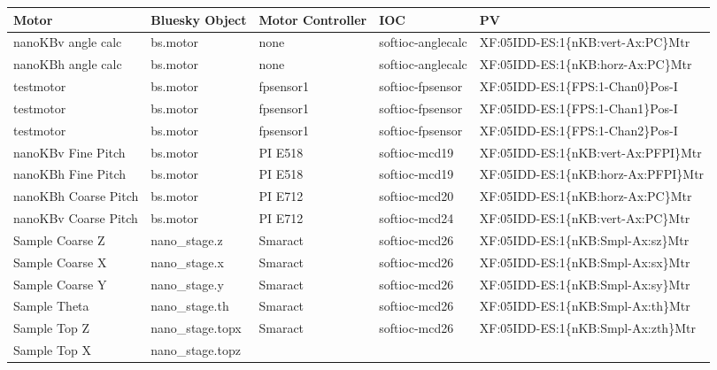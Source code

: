 \documentclass[letterpaper,10pt,english]{sphinxmanual}
\begin{document}
\begin{savenotes}\sphinxattablestart
\raggedright
{}
\sphinxthecaptionisattop
{}\label{\detokenize{staff:xf05idd-ioc3-motors}}
\sphinxaftertopcaption
\begin{tabulary}{\linewidth}[t]{|T|T|T|T|T|}
\hline
\sphinxstyletheadfamily 
Motor
&\sphinxstyletheadfamily 
Bluesky Object
&\sphinxstyletheadfamily 
Motor Controller
&\sphinxstyletheadfamily 
IOC
&\sphinxstyletheadfamily 
PV
\\
\hline
nanoKBv angle calc
&
bs.motor
&
none
&
softioc-anglecalc
&
XF:05IDD-ES:1\{nKB:vert-Ax:PC\}Mtr
\\
\hline
nanoKBh angle calc
&
bs.motor
&
none
&
softioc-anglecalc
&
XF:05IDD-ES:1\{nKB:horz-Ax:PC\}Mtr
\\
\hline
testmotor
&
bs.motor
&
fpsensor1
&
softioc-fpsensor
&
XF:05IDD-ES:1\{FPS:1-Chan0\}Pos-I
\\
\hline
testmotor
&
bs.motor
&
fpsensor1
&
softioc-fpsensor
&
XF:05IDD-ES:1\{FPS:1-Chan1\}Pos-I
\\
\hline
testmotor
&
bs.motor
&
fpsensor1
&
softioc-fpsensor
&
XF:05IDD-ES:1\{FPS:1-Chan2\}Pos-I
\\
\hline
nanoKBv Fine Pitch
&
bs.motor
&
PI E518
&
softioc-mcd19
&
XF:05IDD-ES:1\{nKB:vert-Ax:PFPI\}Mtr
\\
\hline
nanoKBh Fine Pitch
&
bs.motor
&
PI E518
&
softioc-mcd19
&
XF:05IDD-ES:1\{nKB:horz-Ax:PFPI\}Mtr
\\
\hline
nanoKBh Coarse Pitch
&
bs.motor
&
PI E712
&
softioc-mcd20
&
XF:05IDD-ES:1\{nKB:horz-Ax:PC\}Mtr
\\
\hline
nanoKBv Coarse Pitch
&
bs.motor
&
PI E712
&
softioc-mcd24
&
XF:05IDD-ES:1\{nKB:vert-Ax:PC\}Mtr
\\
\hline
Sample Coarse Z
&
nano\_stage.z
&
Smaract
&
softioc-mcd26
&
XF:05IDD-ES:1\{nKB:Smpl-Ax:sz\}Mtr
\\
\hline
Sample Coarse X
&
nano\_stage.x
&
Smaract
&
softioc-mcd26
&
XF:05IDD-ES:1\{nKB:Smpl-Ax:sx\}Mtr
\\
\hline
Sample Coarse Y
&
nano\_stage.y
&
Smaract
&
softioc-mcd26
&
XF:05IDD-ES:1\{nKB:Smpl-Ax:sy\}Mtr
\\
\hline
Sample Theta
&
nano\_stage.th
&
Smaract
&
softioc-mcd26
&
XF:05IDD-ES:1\{nKB:Smpl-Ax:th\}Mtr
\\
\hline
Sample Top Z
&
nano\_stage.topx
&
Smaract
&
softioc-mcd26
&
XF:05IDD-ES:1\{nKB:Smpl-Ax:zth\}Mtr
\\
\hline
Sample Top X
&
nano\_stage.topz
&

\end{tabulary}
\end{savenotes}
\end{document}
